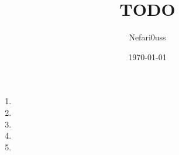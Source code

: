 \documentclass[]{article}
\begin{document}
\title{TODO}
\author{Nefari0uss}
\date{\today}
\maketitle

\begin{enumerate}
    \item
    \item
    \item
    \item
    \item
\end{enumerate}
\end{document}
